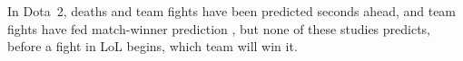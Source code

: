 In Dota~2, deaths \cite{katona2019time} and team fights \cite{tot2021camera} have been predicted
seconds ahead, and team fights have fed match-winner prediction \cite{ke2022}, but none of these
studies predicts, before a fight in LoL begins, which team will win it.

